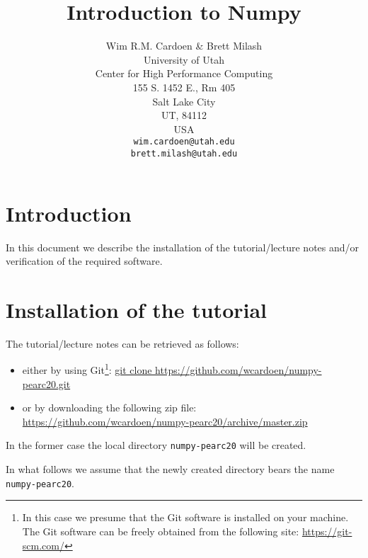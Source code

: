 \documentclass[11pt]{article}
\begin{document}
\title{Introduction to Numpy}
\author{Wim R.M. Cardoen \& Brett Milash\\
        University of Utah\\
        Center for High Performance Computing\\
        155 S. 1452 E., Rm 405\\
        Salt Lake City\\
        UT, 84112\\
        USA\\
        \texttt{wim.cardoen@utah.edu}\\
	\texttt{brett.milash@utah.edu}}
\renewcommand{\today}{July 21, 2020}
\renewcommand{\labelitemii}{$\star$}
\maketitle

\section*{Introduction}
In this document we describe the installation of the tutorial/lecture notes 
and/or verification of the required software.

\renewcommand \thesection{\Roman{section}}
\section{Installation of the tutorial}
The tutorial/lecture notes can be retrieved as follows:
\begin{itemize}
\item either by using Git\footnote{In this case we presume that the Git software is installed on your machine. 
	The Git software can be freely obtained from the following site: \href{https://git-scm.com/}{https://git-scm.com/}}:\newline
		\href{git clone https://github.com/wcardoen/numpy-pearc20.git}{git clone https://github.com/wcardoen/numpy-pearc20.git}
\item or by downloading the following zip file:\newline
	\href{https://github.com/wcardoen/numpy-pearc20/archive/master.zip}{https://github.com/wcardoen/numpy-pearc20/archive/master.zip}
\end{itemize}
In the former case the local directory \texttt{numpy-pearc20} 
will be created. 

In what follows we assume that the newly created directory bears the name \texttt{numpy-pearc20}.  
\end{document}
